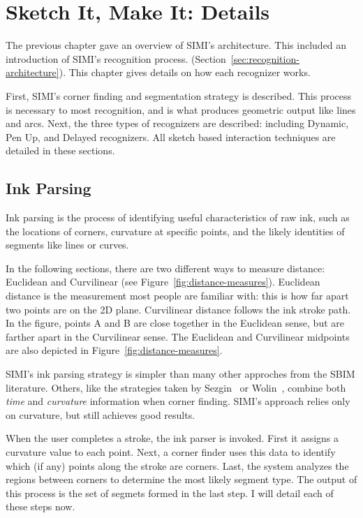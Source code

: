 \chapter{Sketch It, Make It: Details}

The previous chapter gave an overview of SIMI's architecture. This
included an introduction of SIMI's recognition process.
(Section~\ref{sec:recognition-architecture}). This chapter gives
details on how each recognizer works. 

First, SIMI's corner finding and segmentation strategy is
described. This process is necessary to most recognition, and is what
produces geometric output like lines and arcs. Next, the three types
of recognizers are described: including Dynamic, Pen Up, and Delayed
recognizers. All sketch based interaction techniques are detailed in
these sections.

\section{Ink Parsing}
\label{sec:corner-finder}

Ink parsing is the process of identifying useful characteristics of
raw ink, such as the locations of corners, curvature at specific
points, and the likely identities of segments like lines or curves.

In the following sections, there are two different ways to measure
distance: Euclidean and Curvilinear (see
Figure~\ref{fig:distance-measures}). Euclidean distance is the
measurement most people are familiar with: this is how far apart two
points are on the 2D plane. Curvilinear distance follows the ink
stroke path. In the figure, points A and B are close together in the
Euclidean sense, but are farther apart in the Curvilinear sense. The
Euclidean and Curvilinear midpoints are also depicted in
Figure~\ref{fig:distance-measures}. 



SIMI's ink parsing strategy is simpler than many other approches from
the SBIM literature. Others, like the strategies taken by
Sezgin~\cite{sezgin-early-processing} or Wolin~\cite{wolin-smr},
combine both \textit{time} and \textit{curvature} information when
corner finding. SIMI's approach relies only on curvature, but still
achieves good results.

When the user completes a stroke, the ink parser is invoked. First it
assigns a curvature value to each point. Next, a corner finder uses
this data to identify which (if any) points along the stroke are
corners. Last, the system analyzes the regions between corners to
determine the most likely segment type. The output of this process is
the set of segmets formed in the last step. I will detail each of
these steps now.

